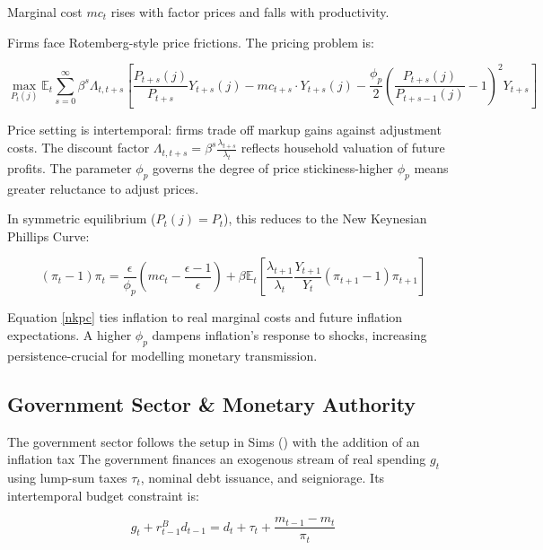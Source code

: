 \documentclass[11pt,preprint]{elsarticle}
\numberwithin{equation}{section}
\numberwithin{figure}{section}
\numberwithin{table}{section}
\begin{document}
Marginal cost \(mc_t\) rises with factor prices and falls with
productivity.

Firms face Rotemberg-style price frictions. The pricing problem is:

\begin{equation}
\max_{P_t(j)} \mathbb{E}_t \sum_{s=0}^{\infty} \beta^s \Lambda_{t,t+s} \left[
\frac{P_{t+s}(j)}{P_{t+s}} Y_{t+s}(j)
- mc_{t+s} \cdot Y_{t+s}(j)
- \frac{\phi_p}{2} \left( \frac{P_{t+s}(j)}{P_{t+s-1}(j)} - 1 \right)^2 Y_{t+s}
\right]
\label{intermediate_objective}
\end{equation}

Price setting is intertemporal: firms trade off markup gains against
adjustment costs. The discount factor
\(\Lambda_{t,t+s} = \beta^s \frac{\lambda_{t+s}}{\lambda_t}\) reflects
household valuation of future profits. The parameter \(\phi_p\) governs
the degree of price stickiness-higher \(\phi_p\) means greater
reluctance to adjust prices.

In symmetric equilibrium (\(P_t(j) = P_t\)), this reduces to the New
Keynesian Phillips Curve:

\begin{equation}
(\pi_t - 1)\pi_t = \frac{\epsilon}{\phi_p} \left( mc_t - \frac{\epsilon-1}{\epsilon} \right) + \beta \mathbb{E}_t \left[ \frac{\lambda_{t+1}}{\lambda_t} \frac{Y_{t+1}}{Y_t} (\pi_{t+1} - 1)\pi_{t+1} \right]
\label{nkpc}
\end{equation}

Equation \eqref{nkpc} ties inflation to real marginal costs and future
inflation expectations. A higher \(\phi_p\) dampens inflation's response
to shocks, increasing persistence-crucial for modelling monetary
transmission.

\subsection{Government Sector \& Monetary
Authority}\label{government-sector-monetary-authority}

The government sector follows the setup in Sims
() with the addition of an inflation
tax The government finances an exogenous stream of real spending \(g_t\)
using lump-sum taxes \(\tau_t\), nominal debt issuance, and seigniorage.
Its intertemporal budget constraint is:

\begin{equation}
g_t + r^B_{t-1} d_{t-1} = d_t + \tau_t + \frac{m_{t-1} - m_t}{\pi_t} \label{Gov_Budget}
\end{equation}
\end{document}
